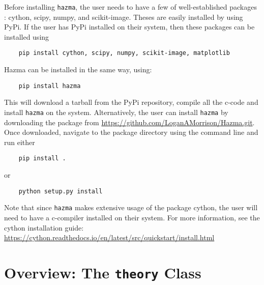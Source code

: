 \documentclass[review]{elsarticle}
\begin{document}
Before installing \texttt{hazma}, the user needs to have a few of well-established packages : cython, scipy, numpy, and scikit-image. Theses are easily installed by using PyPi. If the user has PyPi installed on their system, then these packages can be installed using
\begin{verbatim}
	pip install cython, scipy, numpy, scikit-image, matplotlib
\end{verbatim}
Hazma can be installed in the same way, using:
\begin{verbatim}
	pip install hazma
\end{verbatim}
This will download a tarball from the PyPi repository, compile all the c-code and install \texttt{hazma} on the system. Alternatively, the user can install \texttt{hazma} by downloading the package from \url{https://github.com/LoganAMorrison/Hazma.git}. Once downloaded, navigate to the package directory using the command line and run either
\begin{verbatim}
	pip install .
\end{verbatim}
or
\begin{verbatim}
	python setup.py install
\end{verbatim}


Note that since \texttt{hazma} makes extensive usage of the package cython, the user will need to have a c-compiler installed on their system. For more information, see the cython installation guide: \url{https://cython.readthedocs.io/en/latest/src/quickstart/install.html}




\section{Overview: The \texttt{theory} Class}%
\label{sec:overview_the_theory_class}


\end{document}
